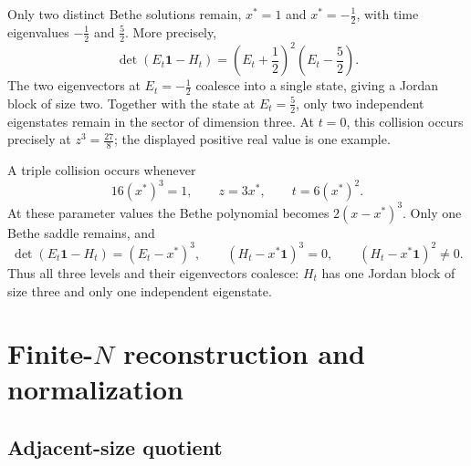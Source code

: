 \documentclass[a4paper,11pt]{article}
\numberwithin{equation}{section}
\begin{document}
Only two distinct Bethe solutions remain,
$x^{*}=1$ and $x^{*}=-\frac{1}{2}$, with time eigenvalues
$-\frac{1}{2}$ and $\frac{5}{2}$.  More precisely,
\begin{equation}
	\det(E_{t}\mathbf{1}-H_{t})
	=\left(E_{t}+\frac{1}{2}\right)^{2}
	\left(E_{t}-\frac{5}{2}\right).
\end{equation}
The two eigenvectors at $E_{t}=-\frac{1}{2}$ coalesce into a single
state, giving a Jordan block of size two.  Together with the state
at $E_{t}=\frac{5}{2}$, only two independent eigenstates remain in
the sector of dimension three.  At $t=0$, this collision occurs precisely at
$z^{3}=\frac{27}{8}$; the displayed positive real value is one example.

A triple collision occurs whenever
\begin{equation}
	16(x^{*})^{3}=1,\qquad z=3x^{*},\qquad t=6(x^{*})^{2}.
\end{equation}
At these parameter values the Bethe polynomial becomes
$2(x-x^{*})^{3}$.  Only one Bethe saddle remains, and
\begin{equation}
	\det(E_{t}\mathbf{1}-H_{t})=(E_{t}-x^{*})^{3},
	\qquad
	(H_{t}-x^{*}\mathbf{1})^{3}=0,
	\qquad
	(H_{t}-x^{*}\mathbf{1})^{2}\neq 0.
\end{equation}
Thus all three levels and their eigenvectors coalesce: $H_{t}$
has one Jordan block of size three and only one independent
eigenstate. 


\section{Finite-\texorpdfstring{$N$}{N} reconstruction and normalization}
\label{appendix:PII action normalization}

\subsection{Adjacent-size quotient}
\label{appendix:PII quotient identity}
\end{document}
